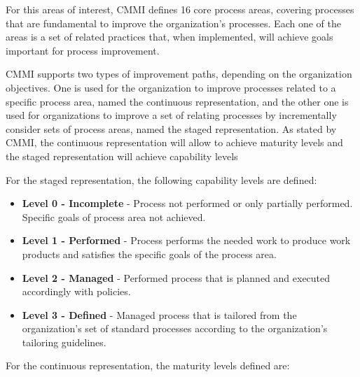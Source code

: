 For this areas of interest, CMMI defines 16 core process areas, covering processes that are fundamental to improve the organization's processes. Each one of the areas is a set of related practices that, when implemented, will achieve goals important for process improvement.\par
CMMI supports two types of improvement paths, depending on the organization objectives. One is used for the organization to improve processes related to a specific process area, named the continuous representation, and the other one is used for organizations to improve a set of relating processes by incrementally consider sets of process areas, named the staged representation. As stated by CMMI, the continuous representation will allow to achieve maturity levels and the staged representation will achieve capability levels\par
For the staged representation, the following capability levels are defined:

\begin{itemize}

\item \textbf{Level 0 - Incomplete} - Process not performed or only partially performed. Specific goals of process area not achieved.

\item \textbf{Level 1 - Performed} - Process performs the needed work to produce work products and satisfies the specific goals of the process area.

\item \textbf{Level 2 - Managed} - Performed process that is planned and executed accordingly with policies.

\item \textbf{Level 3 - Defined} - Managed process that is tailored from the organization's set of standard processes according to the organization's tailoring guidelines.
 
\end{itemize}

For the continuous representation, the maturity levels defined are:

